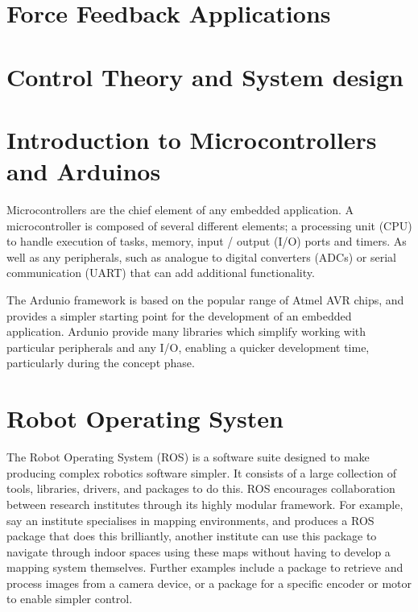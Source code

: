 
\section{Force Feedback Applications} %
\label{sec:force_feedback_applications}




\section{Control Theory and System design} %
\label{sec:control_theory_and_system_design}



\section{Introduction to Microcontrollers and Arduinos} %
\label{sec:introduction_to_microcontrollers_and_arduinos}

Microcontrollers are the chief element of any embedded application. A microcontroller is composed of several different elements; a processing unit (CPU) to handle execution of tasks, memory, input / output (I/O) ports and timers. As well as any peripherals, such as analogue to digital converters (ADCs) or serial communication (UART) that can add additional functionality.

The Ardunio framework is based on the popular range of Atmel AVR chips, and provides a simpler starting point for the development of an embedded application. Ardunio provide many libraries which simplify working with particular peripherals and any I/O, enabling a quicker development time, particularly during the concept phase.


\section{Robot Operating Systen} %
\label{sec:robot_operating_system}

The Robot Operating System (ROS) is a software suite designed to make producing complex robotics software simpler. It consists of a large collection of tools, libraries, drivers, and packages to do this. ROS encourages collaboration between research institutes through its highly modular framework. For example, say an institute specialises in mapping environments, and produces a ROS package that does this brilliantly, another institute can use this package to navigate through indoor spaces using these maps without having to develop a mapping system themselves. Further examples include a package to retrieve and process images from a camera device, or a package for a specific encoder or motor to enable simpler control.


